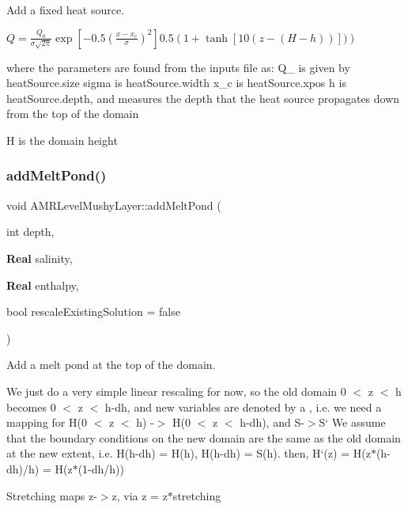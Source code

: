 Add a fixed heat source. 

$ Q = \frac{Q_0}{\sigma \sqrt{2 \pi}} \exp\left[ - 0.5 \left( \frac{x-x_c}{\sigma} \right)^2 \right] 0.5 \left( 1 + \tanh\left[10 (z-(H-h)) \right]) \right) $

where the parameters are found from the inputs file as\+: Q\+\_ is given by heat\+Source.\+size sigma is heat\+Source.\+width x\+\_\+c is heat\+Source.\+xpos h is heat\+Source.\+depth, and measures the depth that the heat source propagates down from the top of the domain

H is the domain height \mbox{\label{class_a_m_r_level_mushy_layer_aa2aeb21dddb01b6406407104dd66c09b}} 
\subsubsection{\texorpdfstring{add\+Melt\+Pond()}{addMeltPond()}}
{\footnotesize\ttfamily void A\+M\+R\+Level\+Mushy\+Layer\+::add\+Melt\+Pond (\begin{DoxyParamCaption}\item[{int}]{depth,  }\item[{\textbf{ Real}}]{salinity,  }\item[{\textbf{ Real}}]{enthalpy,  }\item[{bool}]{rescale\+Existing\+Solution = {\ttfamily false} }\end{DoxyParamCaption})}



Add a melt pond at the top of the domain. 

We just do a very simple linear rescaling for now, so the old domain 0 $<$ z $<$ h becomes 0 $<$ z $<$ h-\/dh, and new variables are denoted by a {\ttfamily , i.\+e. we need a mapping for H(0 $<$ z $<$ h) -\/$>$ H}(0 $<$ z $<$ h-\/dh), and S-\/$>$S` We assume that the boundary conditions on the new domain are the same as the old domain at the new extent, i.\+e. H{\ttfamily (h-\/dh) = H(h), H}(h-\/dh) = S(h). then, H`(z) = H(z$\ast$(h-\/dh)/h) = H(z$\ast$(1-\/dh/h))

Stretching maps z-\/$>$z{\ttfamily , via z} = z$\ast$stretching\mbox{\label{class_a_m_r_level_mushy_layer_ade318c50bdedb60ab371246da6895666}} 
